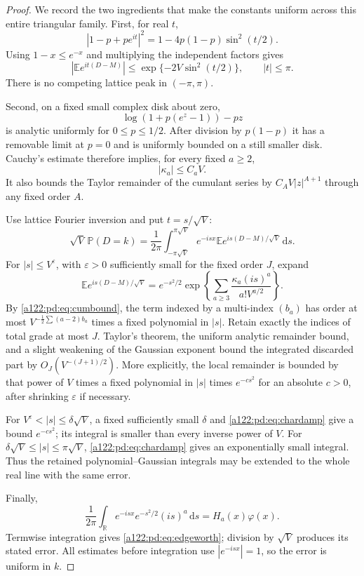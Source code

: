 \documentclass[11pt,letterpaper]{article}
\numberwithin{equation}{subsection}
\theoremstyle{definition}
\theoremstyle{remark}
\theoremstyle{plain}
\newcommand{\E}{\mathbb E}
\newcommand{\Prob}{\mathbb P}
\newcommand{\R}{\mathbb R}
\newcommand{\dd}{\,\mathrm d}
\begin{document}
\begin{proof}
We record the two ingredients that make the constants uniform across
this entire triangular family.
First, for real $t$,
\[
 |1-p+pe^{it}|^2=1-4p(1-p)\sin^2(t/2).
\]
Using $1-x\le e^{-x}$ and multiplying the independent factors gives
\begin{equation}\label{a122:pd:eq:chardamp}
 \left|\E e^{it(D-M)}\right|
 \le\exp\{-2V\sin^2(t/2)\},\qquad |t|\le\pi.
\end{equation}
There is no competing lattice peak in $(-\pi,\pi)$.

Second, on a fixed small complex disk about zero,
\[
 \log(1+p(e^z-1))-pz
\]
is analytic uniformly for $0\le p\le1/2$.
After division by $p(1-p)$ it has a removable limit at $p=0$ and is
uniformly bounded on a still smaller disk. Cauchy's estimate therefore
implies, for every fixed $a\ge2$,
\begin{equation}\label{a122:pd:eq:cumbound}
 |\kappa_a|\le C_a V.
\end{equation}
It also bounds the Taylor remainder of the cumulant series by
$C_A V|z|^{A+1}$ through any fixed order $A$.

Use lattice Fourier inversion and put $t=s/\sqrt V$:
\begin{equation}\label{a122:pd:eq:fourier}
 \sqrt V\,\Prob(D=k)=\frac1{2\pi}
 \int_{-\pi\sqrt V}^{\pi\sqrt V}e^{-isx}
 \E e^{is(D-M)/\sqrt V}\dd s.
\end{equation}
For $|s|\le V^\varepsilon$, with $\varepsilon>0$ sufficiently small
for the fixed order $J$, expand
\[
 \E e^{is(D-M)/\sqrt V}
 =e^{-s^2/2}
 \exp\!\left\{\sum_{a\ge3}\frac{\kappa_a(is)^a}{a!V^{a/2}}\right\}.
\]
By \eqref{a122:pd:eq:cumbound}, the term indexed by a multi-index
$(b_a)$ has order at most $V^{-\frac12\sum(a-2)b_a}$ times a
fixed polynomial in $|s|$.
Retain exactly the indices of total grade at most $J$.
Taylor's theorem, the uniform analytic remainder bound, and a slight
weakening of the Gaussian exponent bound the integrated discarded part
by $O_J(V^{-(J+1)/2})$.
More explicitly, the local remainder is bounded by that power of $V$
times a fixed polynomial in $|s|$ times $e^{-c s^2}$ for an absolute
$c>0$, after shrinking $\varepsilon$ if necessary.

For $V^\varepsilon<|s|\le\delta\sqrt V$, a fixed sufficiently
small $\delta$ and \eqref{a122:pd:eq:chardamp} give a bound
$e^{-c s^2}$; its integral is smaller than every inverse power of $V$.
For $\delta\sqrt V\le|s|\le\pi\sqrt V$,
\eqref{a122:pd:eq:chardamp} gives an exponentially small integral.
Thus the retained polynomial--Gaussian integrals may be extended to the
whole real line with the same error.

Finally,
\[
 \frac1{2\pi}\int_{\R}e^{-isx}e^{-s^2/2}(is)^a\dd s
 =H_a(x)\varphi(x).
\]
Termwise integration gives \eqref{a122:pd:eq:edgeworth}; division by $\sqrt V$
produces its stated error. All estimates before integration use
$|e^{-isx}|=1$, so the error is uniform in $k$.
\end{proof}
\end{document}
